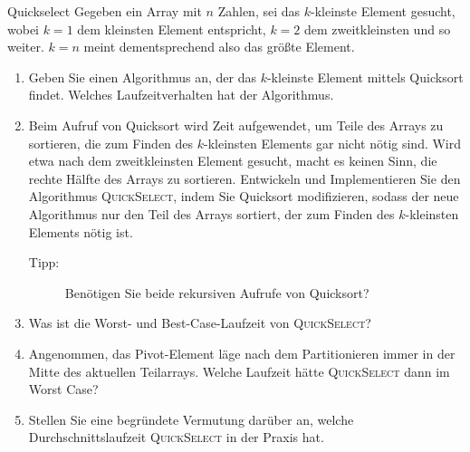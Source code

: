 \documentclass[11pt,a4paper]{article}
\begin{document}
\begin{aufgabe}{4}{Quickselect}
    Gegeben ein Array mit $n$ Zahlen, sei das $k$-kleinste Element gesucht, wobei $k = 1$ dem kleinsten Element entspricht, $k = 2$ dem zweitkleinsten und so weiter.
    $k = n$ meint dementsprechend also das größte Element.
    \begin{enumerate}
        \item Geben Sie einen Algorithmus an, der das $k$-kleinste Element mittels Quicksort findet. Welches Laufzeitverhalten hat der Algorithmus.

        \item Beim Aufruf von Quicksort wird Zeit aufgewendet, um Teile des Arrays zu sortieren, die zum Finden des $k$-kleinsten Elements gar nicht nötig sind.
        Wird etwa nach dem zweitkleinsten Element gesucht, macht es keinen Sinn, die rechte Hälfte des Arrays zu sortieren.
        Entwickeln und Implementieren Sie den Algorithmus \textsc{QuickSelect}, indem Sie Quicksort modifizieren, sodass der neue Algorithmus nur den Teil des Arrays sortiert, der zum Finden des $k$-kleinsten Elements nötig ist.
        \begin{description}
            \item[Tipp:] Benötigen Sie beide rekursiven Aufrufe von Quicksort?
        \end{description}

        \item Was ist die Worst- und Best-Case-Laufzeit von \textsc{QuickSelect}?

        \item Angenommen, das Pivot-Element läge nach dem Partitionieren immer in der Mitte des aktuellen Teil\-arrays. Welche Laufzeit hätte \textsc{QuickSelect} dann im Worst Case?

        \item Stellen Sie eine begründete Vermutung darüber an, welche Durchschnittslaufzeit \textsc{QuickSelect} in der Praxis hat.
    \end{enumerate}
\end{aufgabe}
\end{document}
